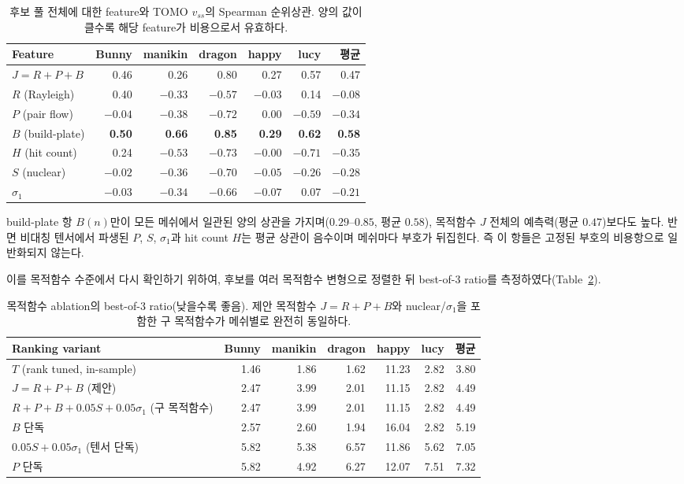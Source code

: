 \documentclass[11pt,a4paper]{article}
\begin{document}
\begin{table}[H]
\centering
\caption{후보 풀 전체에 대한 feature와 TOMO $v_{ss}$의 Spearman 순위상관.
양의 값이 클수록 해당 feature가 비용으로서 유효하다.}
\label{tab:feature-corr}
\begin{tabular}{lrrrrrr}
\toprule
Feature & Bunny & manikin & dragon & happy & lucy & 평균\\
\midrule
$J=R{+}P{+}B$         & 0.46 & 0.26 & 0.80 & 0.27 & 0.57 & 0.47\\
$R$ (Rayleigh)        & 0.40 & $-0.33$ & $-0.57$ & $-0.03$ & 0.14 & $-0.08$\\
$P$ (pair flow)       & $-0.04$ & $-0.38$ & $-0.72$ & 0.00 & $-0.59$ & $-0.34$\\
$B$ (build-plate)     & \textbf{0.50} & \textbf{0.66} & \textbf{0.85} & \textbf{0.29} & \textbf{0.62} & \textbf{0.58}\\
$H$ (hit count)       & 0.24 & $-0.53$ & $-0.73$ & $-0.00$ & $-0.71$ & $-0.35$\\
$S$ (nuclear)         & $-0.02$ & $-0.36$ & $-0.70$ & $-0.05$ & $-0.26$ & $-0.28$\\
$\sigma_1$            & $-0.03$ & $-0.34$ & $-0.66$ & $-0.07$ & 0.07 & $-0.21$\\
\bottomrule
\end{tabular}
\end{table}

build-plate 항 $B(n)$만이 모든 메쉬에서 일관된 양의 상관을 가지며($0.29$--$0.85$, 평균 $0.58$),
목적함수 $J$ 전체의 예측력(평균 $0.47$)보다도 높다.
반면 비대칭 텐서에서 파생된 $P$, $S$, $\sigma_1$과 hit count $H$는 평균 상관이 음수이며
메쉬마다 부호가 뒤집힌다. 즉 이 항들은 고정된 부호의 비용항으로 일반화되지 않는다.

이를 목적함수 수준에서 다시 확인하기 위하여, 후보를 여러 목적함수 변형으로 정렬한 뒤
best-of-3 ratio를 측정하였다(Table~\ref{tab:ablation}).

\begin{table}[H]
\centering
\caption{목적함수 ablation의 best-of-3 ratio(낮을수록 좋음).
제안 목적함수 $J=R+P+B$와 nuclear/$\sigma_1$을 포함한 구 목적함수가 메쉬별로 완전히 동일하다.}
\label{tab:ablation}
\begin{tabular}{lrrrrrr}
\toprule
Ranking variant & Bunny & manikin & dragon & happy & lucy & 평균\\
\midrule
$T$ (rank tuned, in-sample) & 1.46 & 1.86 & 1.62 & 11.23 & 2.82 & 3.80\\
$J=R+P+B$ (제안)            & 2.47 & 3.99 & 2.01 & 11.15 & 2.82 & 4.49\\
$R{+}P{+}B{+}0.05S{+}0.05\sigma_1$ (구 목적함수) & 2.47 & 3.99 & 2.01 & 11.15 & 2.82 & 4.49\\
$B$ 단독                     & 2.57 & 2.60 & 1.94 & 16.04 & 2.82 & 5.19\\
$0.05S+0.05\sigma_1$ (텐서 단독) & 5.82 & 5.38 & 6.57 & 11.86 & 5.62 & 7.05\\
$P$ 단독                     & 5.82 & 4.92 & 6.27 & 12.07 & 7.51 & 7.32\\
\bottomrule
\end{tabular}
\end{table}
\end{document}
